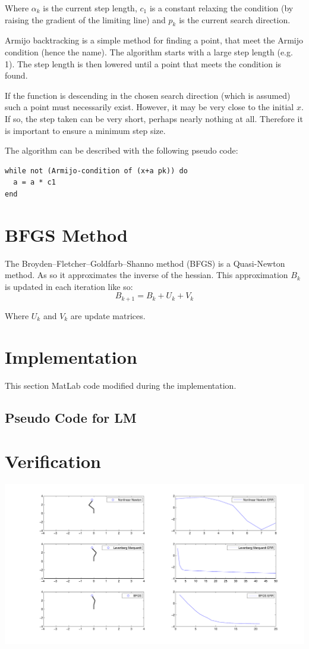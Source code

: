 \documentclass[10pt,oneside,a4paper,final,english]{memoir}
\begin{document}
Where $\alpha_k$ is the current step length, $c_1$ is a constant
relaxing the condition (by raising the gradient of the limiting line)
and $p_k$ is the current search direction.

Armijo backtracking is a simple method for finding a point, that meet
the Armijo condition (hence the name). The algorithm starts with a
large step length (e.g. 1). The step length is then lowered until a
point that meets the condition is found.

If the function is descending in the chosen search direction (which is
assumed) such a point must necessarily exist. However, it may be very
close to the initial $x$. If so, the step taken can be very short,
perhaps nearly nothing at all. Therefore it is important to ensure a
minimum step size.

The algorithm can be described with the following pseudo code:
\begin{verbatim}
while not (Armijo-condition of (x+a pk)) do
  a = a * c1
end
\end{verbatim}


\section{BFGS Method}
The Broyden–Fletcher–Goldfarb–Shanno method (BFGS) is a Quasi-Newton
method. As so it approximates the inverse of the hessian. This
approximation $B_k$ is updated in each iteration like so:
\[ B_{k+1} = B_k + U_k + V_k \]

Where $U_k$ and $V_k$ are update matrices.


\section{Implementation}
This section MatLab code modified during the implementation.

\subsection*{Pseudo Code for LM}


\section{Verification}
\includegraphics[width=\textwidth]{images/graph.pdf}
\end{document}
